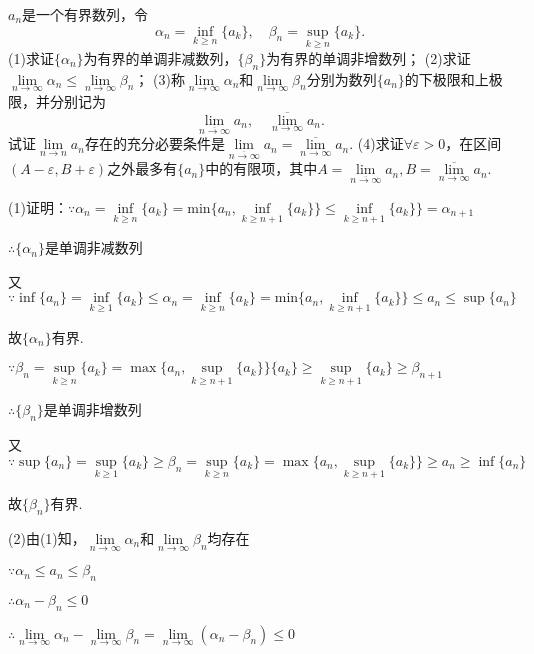 \documentclass[12pt,UTF8]{ctexart}
\begin{document}
\begin{enumerate}
${a_n}$是一个有界数列，令
\[
\alpha_n=\inf\limits_{k\geq n}\{a_k\},\quad\beta_n=\sup\limits_{k\geq n}\{a_k\}.
\]
(1)求证$\{\alpha_n\}$为有界的单调非减数列，$\{\beta_n\}$为有界的单调非增数列；
\newline
(2)求证$\lim\limits_{n\rightarrow\infty}\alpha_n\leq\lim\limits_{n\rightarrow\infty}\beta_n$；
\newline
(3)称$\lim\limits_{n\rightarrow\infty}\alpha_n$和$\lim\limits_{n\rightarrow\infty}\beta_n$分别为数列$\{a_n\}$的下极限和上极限，并分别记为\[
\lim\limits_{\overline{n\rightarrow\infty}}a_n,\quad\overline{\lim\limits_{n\rightarrow\infty}}a_n.
\]
试证$\lim\limits_{n\rightarrow n}a_n$存在的充分必要条件是$\lim\limits_{\overline{n\rightarrow\infty}}a_n=\overline{\lim\limits_{n\rightarrow\infty}}a_n$.
\newline
(4)求证$\forall\varepsilon>0$，在区间$(A-\varepsilon,B+\varepsilon)$之外最多有$\{a_n\}$中的有限项，其中$A=\lim\limits_{\overline{n\rightarrow\infty}}a_n,B=\overline{\lim\limits_{n\rightarrow\infty}}a_n$.

(1)证明：$\because\alpha_n=\inf\limits_{k\geq n}\{a_k\}=\text{min}\{a_n,\inf\limits_{k\geq n+1}\{a_k\}\}\leq\inf\limits_{k\geq n+1}\{a_k\}\}=\alpha_{n+1}$

$\therefore\{\alpha_n\}$是单调非减数列

又$\because\inf\{a_n\}=\inf\limits_{k\geq 1}\{a_k\}\leq\alpha_n=\inf\limits_{k\geq n}\{a_k\}=\text{min}\{a_n,\inf\limits_{k\geq n+1}\{a_k\}\}\leq a_n\leq\sup\{a_n\}$

故$\{\alpha_n\}$有界.

$\because\beta_n=\sup\limits_{k\geq n}\{a_k\}=\max\{a_n,\sup\limits_{k\geq n+1}\{a_k\}\}\{a_k\}\geq\sup\limits_{k\geq n+1}\{a_k\}\geq\beta_{n+1}$

$\therefore\{\beta_n\}$是单调非增数列

又$\because\sup\{a_n\}=\sup\limits_{k\geq1}\{a_k\}\geq\beta_n=\sup\limits_{k\geq n}\{a_k\}=\max\{a_n,\sup\limits_{k\geq n+1}\{a_k\}\}\geq a_n\geq\inf\{a_n\}$

故$\{\beta_n\}$有界.

(2)由(1)知，$\lim\limits_{n\rightarrow\infty}\alpha_n$和$\lim\limits_{n\rightarrow\infty}\beta_n$均存在

$\because\alpha_n\leq a_n\leq\beta_n$

$\therefore\alpha_n-\beta_n\leq0$

$\therefore\lim\limits_{n\rightarrow\infty}\alpha_n-\lim\limits_{n\rightarrow\infty}\beta_n=\lim\limits_{n\rightarrow\infty}(\alpha_n-\beta_n)\leq0$


\end{enumerate}
\end{document}
